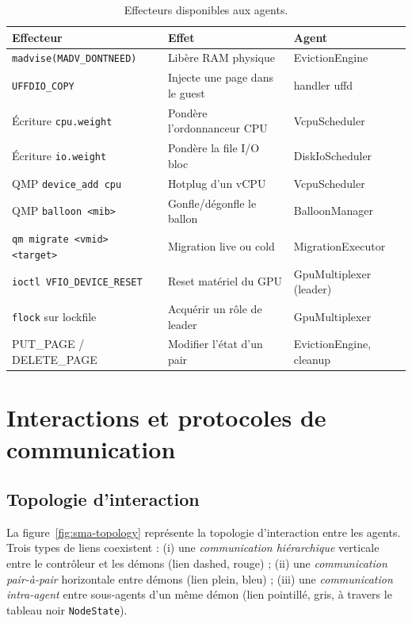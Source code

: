 \begin{table}[H]
\centering
\small
\caption{Effecteurs disponibles aux agents.}
\begin{tabular}{lp{4cm}p{4.5cm}}
\toprule
\textbf{Effecteur} & \textbf{Effet} & \textbf{Agent} \\
\midrule
\texttt{madvise(MADV\_DONTNEED)}         & Libère RAM physique         & EvictionEngine \\
\texttt{UFFDIO\_COPY}                    & Injecte une page dans le guest & handler uffd \\
Écriture \texttt{cpu.weight}             & Pondère l'ordonnanceur CPU  & VcpuScheduler \\
Écriture \texttt{io.weight}              & Pondère la file I/O bloc    & DiskIoScheduler \\
QMP \texttt{device\_add cpu}             & Hotplug d'un vCPU           & VcpuScheduler \\
QMP \texttt{balloon <mib>}               & Gonfle/dégonfle le ballon   & BalloonManager \\
\texttt{qm migrate <vmid> <target>}      & Migration live ou cold      & MigrationExecutor \\
\texttt{ioctl VFIO\_DEVICE\_RESET}       & Reset matériel du GPU       & GpuMultiplexer (leader) \\
\texttt{flock} sur lockfile              & Acquérir un rôle de leader  & GpuMultiplexer \\
PUT\_PAGE / DELETE\_PAGE                 & Modifier l'état d'un pair   & EvictionEngine, cleanup \\
\bottomrule
\end{tabular}

\label{tab:effecteurs}
\end{table}

\section{Interactions et protocoles de communication}
\label{sec:sma-interactions}

\subsection{Topologie d'interaction}

La figure~\ref{fig:sma-topology} représente la topologie d'interaction entre les agents. Trois types de liens coexistent : (i) une \emph{communication hiérarchique} verticale entre le contrôleur et les démons (lien dashed, rouge) ; (ii) une \emph{communication pair-à-pair} horizontale entre démons (lien plein, bleu) ; (iii) une \emph{communication intra-agent} entre sous-agents d'un même démon (lien pointillé, gris, à travers le tableau noir \texttt{NodeState}).

